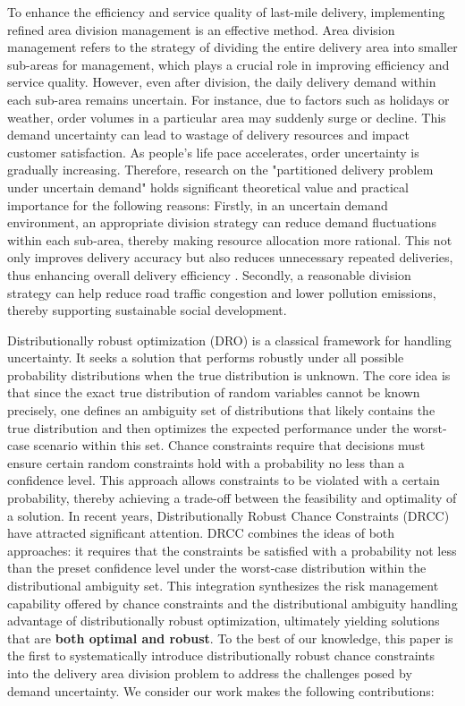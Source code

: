\documentclass[preprint,12pt,authoryear]{elsarticle}
\begin{document}
To enhance the efficiency and service quality of last-mile delivery, implementing refined area division management is an effective method. Area division management refers to the strategy of dividing the entire delivery area into smaller sub-areas for management, which plays a crucial role in improving efficiency and service quality.
However, even after division, the daily delivery demand within each sub-area remains uncertain. For instance, due to factors such as holidays or weather, order volumes in a particular area may suddenly surge or decline. This demand uncertainty can lead to wastage of delivery resources and impact customer satisfaction.
As people's life pace accelerates, order uncertainty is gradually increasing. Therefore, research on the "partitioned delivery problem under uncertain demand" holds significant theoretical value and practical importance for the following reasons: Firstly, in an uncertain demand environment, an appropriate division strategy can reduce demand fluctuations within each sub-area, thereby making resource allocation more rational. This not only improves delivery accuracy but also reduces unnecessary repeated deliveries, thus enhancing overall delivery efficiency . Secondly, a reasonable division strategy can help reduce road traffic congestion and lower pollution emissions, thereby supporting sustainable social development.

Distributionally robust optimization (DRO) is a classical framework for handling uncertainty. It seeks a solution that performs robustly under all possible probability distributions when the true distribution is unknown. The core idea is that since the exact true distribution of random variables cannot be known precisely, one defines an ambiguity set of distributions that likely contains the true distribution and then optimizes the expected performance under the worst-case scenario within this set.
Chance constraints require that decisions must ensure certain random constraints hold with a probability no less than a confidence level. This approach allows constraints to be violated with a certain probability, thereby achieving a trade-off between the feasibility and optimality of a solution.
In recent years, Distributionally Robust Chance Constraints (DRCC) have attracted significant attention. DRCC combines the ideas of both approaches: it requires that the constraints be satisfied with a probability not less than the preset confidence level under the worst-case distribution within the distributional ambiguity set. This integration synthesizes the risk management capability offered by chance constraints and the distributional ambiguity handling advantage of distributionally robust optimization, ultimately yielding solutions that are \textbf{both optimal and robust}.
To the best of our knowledge, this paper is the first to systematically introduce distributionally robust chance constraints into the delivery area division problem to address the challenges posed by demand uncertainty. We consider our work makes the following contributions:
\end{document}

